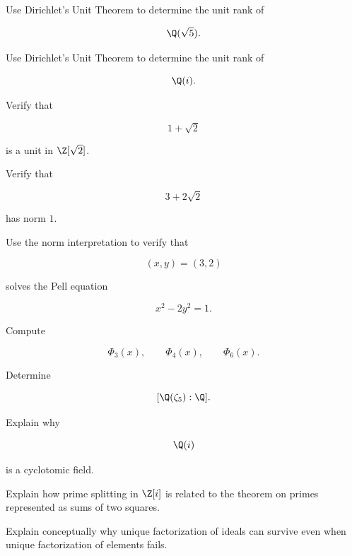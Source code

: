 \begin{exercise}[2]
Use Dirichlet's Unit Theorem to determine the unit rank of

\[ \Q(\sqrt5). \]
\end{exercise}

\begin{exercise}[2]
Use Dirichlet's Unit Theorem to determine the unit rank of

\[ \Q(i). \]
\end{exercise}

\begin{exercise}[2]
Verify that

\[ 1+\sqrt2 \]

is a unit in \(\Z[\sqrt2]\).
\end{exercise}

\begin{exercise}[2]
Verify that

\[ 3+2\sqrt2 \]

has norm \(1\).
\end{exercise}

\begin{exercise}[2]
Use the norm interpretation to verify that

\[ (x,y)=(3,2) \]

solves the Pell equation

\[ x^2-2y^2=1. \]
\end{exercise}

\begin{exercise}[2]
Compute

\[ \Phi_3(x),\qquad\Phi_4(x),\qquad\Phi_6(x). \]
\end{exercise}

\begin{exercise}[2]
Determine

\[ [\Q(\zeta_5):\Q]. \]
\end{exercise}

\begin{exercise}[2]
Explain why

\[ \Q(i) \]

is a cyclotomic field.
\end{exercise}

\begin{exercise}[3]
Explain how prime splitting in \(\Z[i]\) is related to the theorem on primes
represented as sums of two squares.
\end{exercise}

\begin{exercise}[3]
Explain conceptually why unique factorization of ideals can survive even when
unique factorization of elements fails.
\end{exercise}


